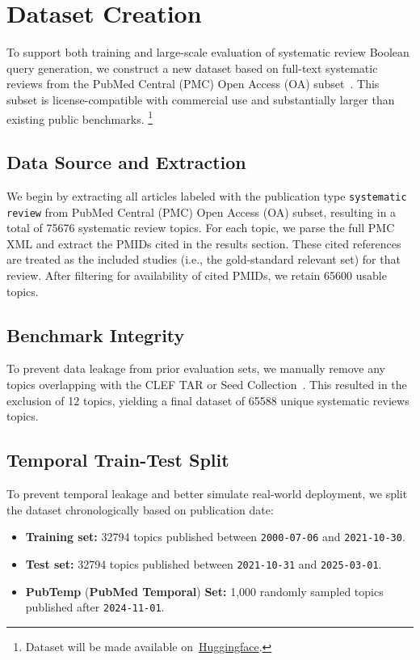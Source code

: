 \section{Dataset Creation}
\label{sec:dataset}
To support both training and large-scale evaluation of systematic review Boolean query generation, we construct a new dataset based on full-text systematic reviews from the PubMed Central (PMC) Open Access (OA) subset~\cite{pmc_open_access_subset}. This subset is license-compatible with commercial use and substantially larger than existing public benchmarks.%
\footnote{Dataset will be made available on~\href{https://www.example.com}{Huggingface}.}

\subsection{Data Source and Extraction}
We begin by extracting all articles labeled with the publication type \texttt{systematic review} from PubMed Central (PMC) Open Access (OA) subset, resulting in a total of \num{75676} systematic review topics. For each topic, we parse the full PMC XML and extract the PMIDs cited in the results section. These cited references are treated as the included studies (i.e., the gold-standard relevant set) for that review. After filtering for availability of cited PMIDs, we retain \num{65600} usable topics.

\subsection{Benchmark Integrity}
To prevent data leakage from prior evaluation sets, we manually remove any topics overlapping with the CLEF TAR or Seed Collection~\cite{kanoulas2018clef, wang2022little}. This resulted in the exclusion of 12 topics, yielding a final dataset of \num{65588} unique systematic reviews topics.

\subsection{Temporal Train-Test Split}
To prevent temporal leakage and better simulate real-world deployment, we split the dataset chronologically based on publication date:
\begin{itemize}\setlength\itemsep{0ex}
	\item \textbf{Training set:} \num{32794} topics published between \texttt{2000-07-06} and \texttt{2021-10-30}.
	\item \textbf{Test set:} \num{32794} topics published between \texttt{2021-10-31} and \texttt{2025-03-01}.
	\item \textbf{PubTemp} (\textbf{PubMed Temporal}) \textbf{Set:} 1,000 randomly sampled topics published after \texttt{2024-11-01}.
\end{itemize}

